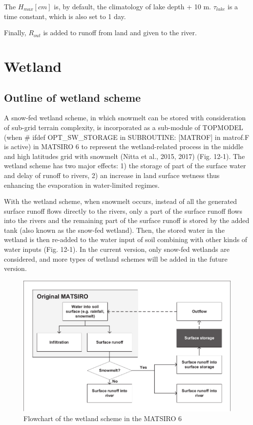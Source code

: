 The \(H_{max} [cm]\) is, by default, the climatology of lake depth + 10 m. \(\tau_{lake}\) is a time constant, which is also set to 1 day.

Finally, \(R_{out}\) is added to runoff from land and given to the river.

\hypertarget{wetland}{%
\section{Wetland}\label{wetland}}

\hypertarget{outline-of-wetland-scheme}{%
\subsection{Outline of wetland scheme}\label{outline-of-wetland-scheme}}

A snow-fed wetland scheme, in which snowmelt can be stored with consideration of sub-grid terrain complexity, is incorporated as a sub-module of TOPMODEL (when \# ifdef OPT\_SW\_STORAGE in SUBROUTINE:
{[}MATROF{]} in matrof.F is active) in MATSIRO 6 to represent the wetland-related process in the middle and high latitudes grid with snowmelt (Nitta et al., 2015, 2017) (Fig. 12-1). The wetland scheme
has two major effects: 1) the storage of part of the surface water and delay of runoff to rivers, 2) an increase in land surface wetness thus enhancing the evaporation in water-limited regimes.

With the wetland scheme, when snowmelt occurs, instead of all the generated surface runoff flows directly to the rivers, only a part of the surface runoff flows into the rivers and the remaining part
of the surface runoff is stored by the added tank (also known as the snow-fed wetland). Then, the stored water in the wetland is then re-added to the water input of soil combining with other kinds of
water inputs (Fig. 12-1). In the current version, only snow-fed wetlands are considered, and more types of wetland schemes will be added in the future version.

\begin{figure}
\centering
\includegraphics{descript/Wetland_12-1.pdf}
\caption{Flowchart of the wetland scheme in the MATSIRO 6}
\end{figure}

